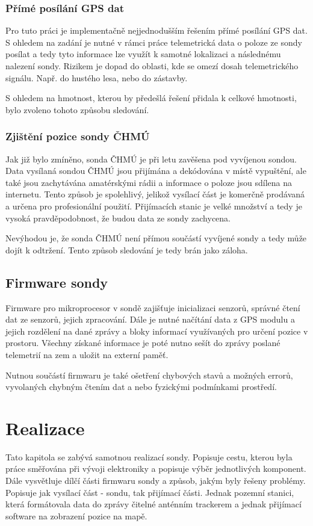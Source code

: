 \documentclass[twoside]{ctuthesis}
\theoremstyle{plain}
\theoremstyle{definition}
\theoremstyle{note}
\begin{document}
			\subsection{Přímé posílání GPS dat}
			Pro tuto práci je implementačně nejjednodušším řešením přímé posílání GPS dat. S ohledem na zadání je nutné v rámci práce telemetrická data o poloze ze sondy posílat a tedy tyto informace lze využít k samotné lokalizaci a následnému nalezení sondy. Rizikem je dopad do oblasti, kde se omezí dosah telemetrického signálu. Např. do hustého lesa, nebo do zástavby.

			S ohledem na hmotnost, kterou by předešlá řešení přidala k celkové hmotnosti, bylo zvoleno tohoto způsobu sledování.

			\subsection{Zjištění pozice sondy ČHMÚ}
			Jak již bylo zmíněno, sonda ČHMÚ je při letu zavěšena pod vyvíjenou sondou. Data vysílaná sondou ČHMÚ jsou přijímána a dekódována v místě vypuštění, ale také jsou zachytávána amatérskými rádii a informace o poloze jsou sdílena na internetu. Tento způsob je spolehlivý, jelikož vysílací část je komerčně prodávaná a určena pro profesionální použití. Přijímacích stanic je velké množství a tedy je vysoká pravděpodobnost, že budou data ze sondy zachycena. 

			Nevýhodou je, že sonda ČHMÚ není přímou součástí vyvíjené sondy a tedy může dojít k odtržení. Tento způsob sledování je tedy brán jako záloha.


		
	\section{Firmware sondy}
	Firmware pro mikroprocesor v sondě zajišťuje inicializaci senzorů, správné čtení dat ze senzorů, jejich zpracování. Dále je nutné načítání data z GPS modulu a jejich rozdělení na dané zprávy a bloky informací využívaných pro určení pozice v prostoru. Všechny získané informace je poté nutno sešít do zprávy poslané telemetrií na zem a uložit na externí paměť. 

	Nutnou součástí firmwaru je také ošetření chybových stavů a možných errorů, vyvolaných chybným čtením dat a nebo fyzickými podmínkami prostředí.
	

\chapter{Realizace}
Tato kapitola se zabývá samotnou realizací sondy. Popisuje cestu, kterou byla práce směřována při vývoji elektroniky a popisuje výběr jednotlivých komponent. Dále vysvětluje dílčí části firmwaru sondy a způsob, jakým byly řešeny problémy. Popisuje jak vysílací část - sondu, tak přijímací části. Jednak pozemní stanici, která formátovala data do zprávy čitelné anténním trackerem a jednak přijímací software na zobrazení pozice na mapě.
\end{document}
